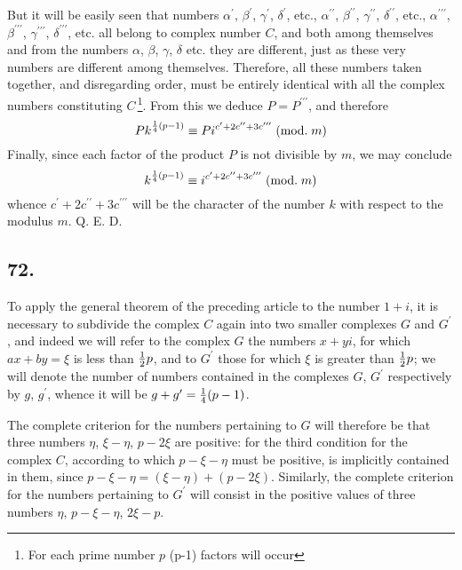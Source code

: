 \documentclass[twoside,12pt, showframe]{memoir}
\renewcommand{\pmod}[1]{\;(\textrm{mod.}\;#1)}
\let\oldfrac\frac
\def\frac#1#2{\mathchoice{\tfrac{#1}{#2}}{\oldfrac{#1}{#2}}{\genfrac{}{}{}{2}{#1}{#2\mathstrut}}{\genfrac{}{}{}{3}{#1}{#2\mathstrut}}}
\begin{document}
But it will be easily seen that numbers \(\alpha^{\prime}\), \( \beta^{\prime}\), \( \gamma^{\prime}\), \( \delta^{\prime}\), etc., \(\alpha^{\prime \prime}\), \( \beta^{\prime \prime}\), \( \gamma^{\prime \prime}\), \( \delta^{\prime \prime}\), etc., \(\alpha^{\prime \prime \prime}\), \( \beta^{\prime \prime \prime}\), \( \gamma^{\prime \prime \prime}\), \( \delta^{\prime \prime \prime}\), etc. all belong to complex number \(C\), and both among themselves and from the numbers \(\alpha\), \( \beta\), \( \gamma\), \( \delta\) etc. they are different, just as these very numbers are different among themselves. Therefore, all these numbers taken together, and disregarding order, must be entirely identical with all the complex numbers constituting \(C\, \)\footnote{For each prime number \(p\) (p-1) factors will occur}. From this we deduce \(P=P^{\prime \prime \prime}\), and therefore
\[P k^{\frac{1}{4}(p-1)} \equiv P i^{c^{\prime}+2 c^{\prime \prime}+3 c^{\prime \prime \prime}}\pmod{m}\]
Finally, since each factor of the product \(P\) is not divisible by \(m\), we may conclude
\[k^{\frac{1}{4}(p-1)} \equiv i^{c^{\prime}+2 c^{\prime \prime}+3 c^{\prime \prime \prime}}\pmod{m}\]
whence \(c^{\prime}+2 c^{\prime \prime}+3 c^{\prime \prime \prime}\) will be the character of the number \(k\) with respect to the modulus \(m\). Q. E. D.
%

\subsection*{72.}

To apply the general theorem of the preceding article to the number \(1+i\), it is necessary to subdivide the complex \(C\) again into two smaller complexes \(G\) and \(G^{\prime}\), and indeed we will refer to the complex \(G\) the numbers \(x+yi\), for which \(ax+by = \xi\) is less than \(\frac{1}{2}p\), and to \(G^{\prime}\) those for which \(\xi\) is greater than \(\frac{1}{2}p\); we will denote the number of numbers contained in the complexes \(G\), \(G^{\prime}\) respectively by \(g\), \(g^{\prime}\), whence it will be \(g+g^{\prime} = \frac{1}{4}(p-1)\).

The complete criterion for the numbers pertaining to \(G\) will therefore be that three numbers \(\eta\), \(\xi-\eta\), \(p-2\xi\) are positive: for the third condition for the complex \(C\), according to which \(p-\xi-\eta\) must be positive, is implicitly contained in them, since \(p-\xi-\eta = (\xi-\eta) + (p-2\xi)\). Similarly, the complete criterion for the numbers pertaining to \(G^{\prime}\) will consist in the positive values of three numbers \(\eta\), \(p-\xi-\eta\), \(2\xi-p\).
\end{document}
